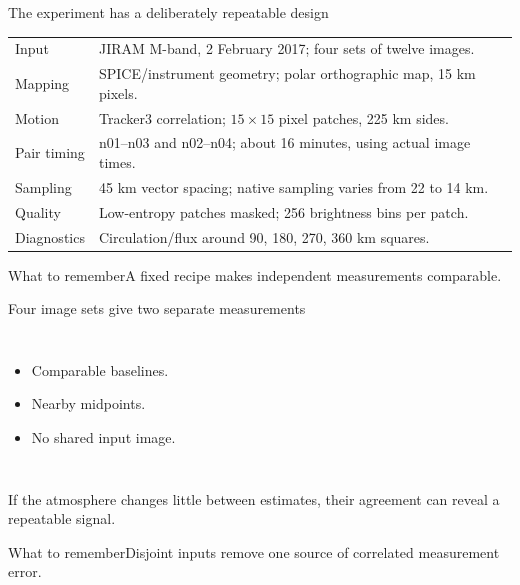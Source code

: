 \documentclass[aspectratio=169,11pt]{beamer}
\newcommand{\prov}{}
\newcommand{\evidence}[1]{\gdef\prov{#1}}
\newcommand{\takeaway}[1]{\vspace{0.3em}\begin{block}{What to remember}#1\end{block}}
\begin{document}
\evidence{Reported method: Ingersoll et al., Methods, Fig. 2 caption, Table 1. DOI linked on source slide.}
\begin{frame}{The experiment has a deliberately repeatable design}
 \small
 \begin{tabularx}{\linewidth}{@{}p{3.4cm}X@{}}
 \toprule
 Input & JIRAM M-band, 2 February 2017; four sets of twelve images.\\
 Mapping & SPICE/instrument geometry; polar orthographic map, 15 km pixels.\\
 Motion & Tracker3 correlation; $15\times15$ pixel patches, 225 km sides.\\
 Pair timing & n01--n03 and n02--n04; about 16 minutes, using actual image times.\\
 Sampling & 45 km vector spacing; native sampling varies from 22 to 14 km.\\
 Quality & Low-entropy patches masked; 256 brightness bins per patch.\\
 Diagnostics & Circulation/flux around 90, 180, 270, 360 km squares.\\
 \bottomrule
 \end{tabularx}
 \takeaway{A fixed recipe makes independent measurements comparable.}
\end{frame}

\evidence{Pairing design from Ingersoll et al., Methods and Fig. 2; timeline is an original schematic.}
\begin{frame}{Four image sets give two separate measurements}
 \begin{columns}[c]
 \begin{itemize}
  \item Comparable baselines.
  \item Nearby midpoints.
  \item No shared input image.
 \end{itemize}
 \end{columns}
 \vspace{0.5cm}
 If the atmosphere changes little between estimates, their agreement can
 reveal a repeatable signal.
 \takeaway{Disjoint inputs remove one source of correlated measurement error.}
\end{frame}
\end{document}
